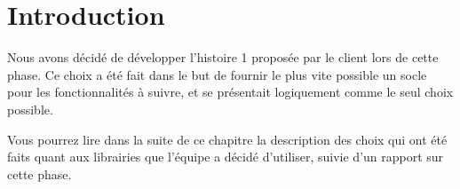 \section{Introduction}
Nous avons décidé de développer l'histoire 1 proposée par le client
lors de cette phase. Ce choix a été fait dans le but de fournir le
plus vite possible un socle pour les fonctionnalités à suivre, et se
présentait logiquement comme le seul choix possible.

Vous pourrez lire dans la suite de ce chapitre la description des choix qui ont 
été faits quant aux librairies que l'équipe a décidé d'utiliser, suivie d'un
rapport sur cette phase.

